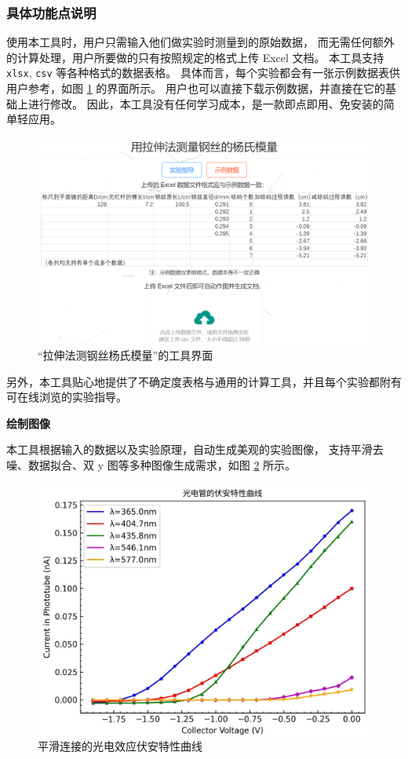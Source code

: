 \subsubsection{具体功能点说明}

使用本工具时，用户只需输入他们做实验时测量到的原始数据，
而无需任何额外的计算处理，用户所要做的只有按照规定的格式上传 Excel 文档。
本工具支持 \verb|xlsx|, \verb|csv| 等各种格式的数据表格。
具体而言，每个实验都会有一张示例数据表供用户参考，如图 \ref{fig:interface} 的界面所示。
用户也可以直接下载示例数据，并直接在它的基础上进行修改。
因此，本工具没有任何学习成本，是一款即点即用、免安装的简单轻应用。

\begin{figure}[p]
  \centering
  \includegraphics[width=0.67\columnwidth]{figure/interface.png}
  \caption{“拉伸法测钢丝杨氏模量”的工具界面}
  \label{fig:interface}
\end{figure}

另外，本工具贴心地提供了不确定度表格与通用的计算工具，并且每个实验都附有可在线浏览的实验指导。

{\noindent\bfseries\textbullet{}绘制图像}

本工具根据输入的数据以及实验原理，自动生成美观的实验图像，
支持平滑去噪、数据拟合、双 y 图等多种图像生成需求，如图 \ref{fig:draw} 所示。

\begin{figure}[p]
  \centering
  \includegraphics[width=0.67\columnwidth]{figure/draw.jpg}
  \caption{平滑连接的光电效应伏安特性曲线}
  \label{fig:draw}
\end{figure}

